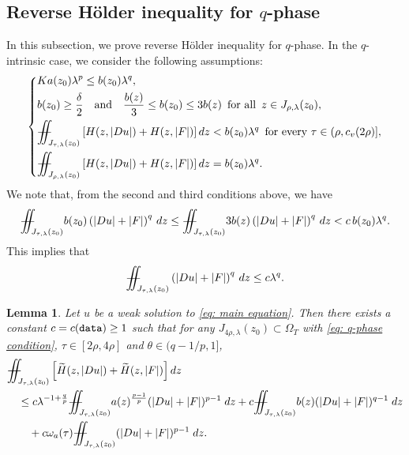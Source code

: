 \documentclass[11pt,oneside, english,reqno,twoside a4paper]{amsart}
\newtheorem{lemma}{Lemma}[section]
\theoremstyle{definition}
\numberwithin{theorem}{section}
\numberwithin{equation}{section}
\newcommand{\la}{\lambda}
\newcommand{\iintss}{{\int\hspace{-0.28cm}\int}}
\newcommand{ \miints }{{\iintss\hspace{-0.56cm} -\hspace{-0.15cm}-}}
\newcommand{\miint}[1]{{\miints_{\hspace{-0.13cm}#1}}}
\begin{document}
\subsection{Reverse H\"{o}lder inequality for $q$-phase} In this subsection, we prove reverse H\"{o}lder inequality for $q$-phase. In the $q$-intrinsic case, we consider the following assumptions:\begin{equation}\label{eq: q-phase condition}
\left\{
\begin{aligned}
&Ka(z_0)\lambda^p \leq b(z_0)\lambda^q,\\
& b(z_0)\geq \frac{\delta}{2} \quad \text{and}\quad \frac{b(z)}{3}\leq b(z_0)\leq 3b(z) \ \, \text{for all}\,\,\, z\in J_{\rho, \la}(z_0),\\
&\miint{J_{\tau,\lambda}(z_0)} \left[H(z,|Du|)+H(z,|F|)\right] dz <b(z_0)\lambda^q \ \, \text{for every }\tau\in(\rho,c_v(2\rho)],\\
&\miint{J_{\rho,\lambda}(z_0)} \left[H(z,|Du|)+H(z,|F|)\right] dz =b(z_0)\lambda^q.
\end{aligned}
\right.
\end{equation}
We note that, from the second and third conditions above, we have
\begin{align*}
\miint{J_{\tau, \lambda}(z_0)}b(z_0)\left(|Du|+|F|\right)^q\, dz\leq \miint{J_{\tau, \lambda}(z_0)}3 b(z)\left(|Du|+|F|\right)^q\, dz< c\, b(z_0)\lambda^q.
\end{align*}
This implies that
\begin{align}\label{EQQ3.5}
\miint{J_{\tau, \lambda}(z_0)}\left(|Du|+|F|\right)^q\, dz \leq c\lambda^q.    
\end{align}
\begin{lemma} \label{lem:q-phase1}
Let $u$ be a weak solution to \eqref{eq: main equation}. Then there exists a constant $c=c(\textnormal{\texttt{data}}) \geq 1$ such that for any $J_{4\rho,\lambda}(z_0)\subset \Omega_T$ with \eqref{eq: q-phase condition}, $\tau \in [2\rho,4\rho]$ and $\theta \in (q-1/p,1]$, 
\begin{align*}
&\miint{J_{\tau,\lambda}(z_0)} \left[ \widetilde{H}(z,|Du|)+\widetilde{H}(z,|F|)\right] d z \\
&\quad \leq c \lambda^{-1+\frac{q}{p}} \miint{J_{\tau,\lambda}(z_0)}a(z)^{\frac{p-1}{p}}(|D u|+|F|)^{p-1}\; dz +c  \miint{J_{\tau,\lambda}(z_0)} b(z)(|Du|+|F|)^{q-1}\; dz \\
&\qquad +c\omega_a(\tau) \miint{J_{\tau,\lambda}(z_0)} (|Du|+|F|)^{p-1} \; dz.
\end{align*}
\end{lemma}
\end{document}
